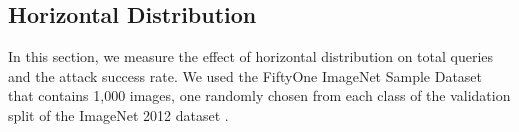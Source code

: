 



\subsection{Horizontal Distribution}

In this section, we measure the effect of horizontal distribution on total queries and the attack success rate. We used the FiftyOne ImageNet Sample Dataset that contains 1,000 images, one randomly chosen from each class of the validation split of the ImageNet 2012 dataset \citep{moore2020fiftyone}.


